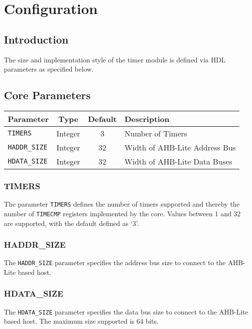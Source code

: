 \chapter{Configuration} \label{configurations}

\section{Introduction}\label{introduction}

The size and implementation style of the timer module is defined via HDL
parameters as specified below.

\section{Core Parameters}\label{core-parameters}

\begin{longtable}[]{@{}lccl@{}}
\toprule
Parameter & Type & Default & Description\tabularnewline
\midrule
\endhead
\texttt{TIMERS}      & Integer & 3  & Number of Timers\tabularnewline
\texttt{HADDR\_SIZE} & Integer & 32 & Width of AHB-Lite Address Bus\tabularnewline
\texttt{HDATA\_SIZE} & Integer & 32 & Width of AHB-Lite Data Buses\tabularnewline
\bottomrule
\end{longtable}

\subsection{TIMERS}\label{timers}

The parameter \texttt{\texttt{TIMERS}} defines the number of timers supported and thereby
the number of \texttt{TIMECMP} registers implemented by the core. Values between
1 and 32 are supported, with the default defined as `3'.

\subsection{HADDR\_SIZE}\label{haddr_size}

The \texttt{HADDR\_SIZE} parameter specifies the address bus size to connect to
the AHB-Lite based host.

\subsection{HDATA\_SIZE}\label{hdata_size}

The \texttt{HDATA\_SIZE} parameter specifies the data bus size to connect to the
AHB-Lite based host. The maximum size supported is 64 bits.

